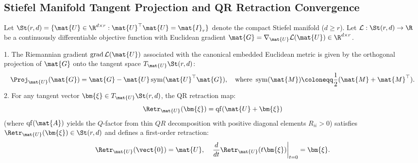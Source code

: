 \subsection{Stiefel Manifold Tangent Projection and QR Retraction Convergence}
\label{sec:proof_stiefel}

\begin{theorem}
Let $\St(r, d) = \{\mat{U} \in \R^{d \times r} : \mat{U}^\top \mat{U} = \mat{I}_r\}$ denote the compact Stiefel manifold ($d \ge r$). Let $\mathcal{L}: \St(r, d) \to \R$ be a continuously differentiable objective function with Euclidean gradient $\mat{G} = \nabla_{\mat{U}} \mathcal{L}(\mat{U}) \in \R^{d \times r}$.

1. The Riemannian gradient $\operatorname{grad} \mathcal{L}(\mat{U})$ associated with the canonical embedded Euclidean metric is given by the orthogonal projection of $\mat{G}$ onto the tangent space $T_{\mat{U}} \St(r, d)$:
\begin{equation}
\Proj_{\mat{U}}(\mat{G}) = \mat{G} - \mat{U} \operatorname{sym}(\mat{U}^\top \mat{G}), \quad \text{where } \operatorname{sym}(\mat{M}) \coloneqq \frac{1}{2}(\mat{M} + \mat{M}^\top).
\end{equation}
2. For any tangent vector $\bm{\xi} \in T_{\mat{U}} \St(r, d)$, the QR retraction map:
\begin{equation}
\Retr_{\mat{U}}(\bm{\xi}) = \operatorname{qf}(\mat{U} + \bm{\xi})
\end{equation}
(where $\operatorname{qf}(\mat{A})$ yields the $Q$-factor from thin $QR$ decomposition with positive diagonal elements $R_{ii} > 0$) satisfies $\Retr_{\mat{U}}(\bm{\xi}) \in \St(r, d)$ and defines a first-order retraction:
\begin{equation}
\Retr_{\mat{U}}(\vect{0}) = \mat{U}, \quad \left.\frac{d}{dt} \Retr_{\mat{U}}(t \bm{\xi})\right|_{t=0} = \bm{\xi}.
\end{equation}
\end{theorem}

